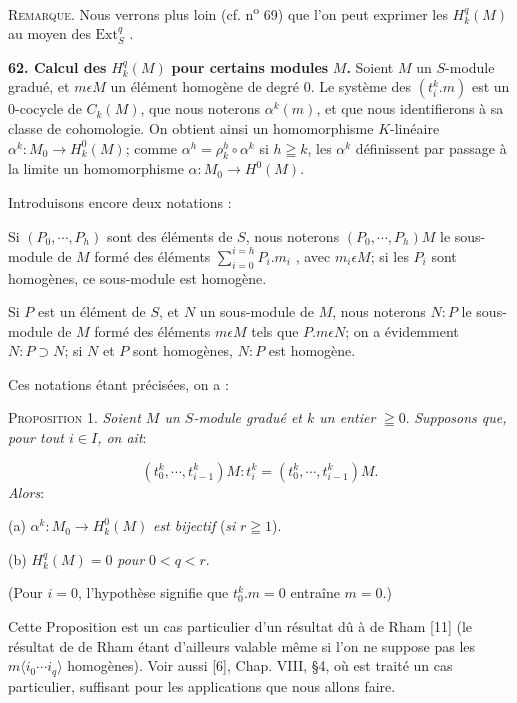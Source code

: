 \textsc{Remarque}. Nous verrons plus loin (cf. n\textsuperscript{o} 69) que l'on peut exprimer les $H^q_k(M)$ au moyen des $\mathrm{Ext}^q_S$ .

\textbf{62. Calcul des} $H^q_k(M)$ \textbf{pour certains modules} $M$\textbf{.} Soient $M$ un $S$-module gradué, et $m \epsilon M$ un élément homogène de degré 0. Le système des $(t^k_i.m)$ est un 0-cocycle de $C_k(M)$, que nous noterons $\alpha^k(m)$, et que nous identifierons à sa classe de cohomologie. On obtient ainsi un homomorphisme $K$-linéaire $\alpha^k: M_0 \to H^0_k(M)$; comme $\alpha^h = \rho^h_k \circ \alpha^k$ si $h \geqq k$, les $\alpha^k$ définissent par passage à la limite un homomorphisme $\alpha: M_0 \to H^0(M)$.

Introduisons encore deux notations :

Si $(P_0 , \cdots , P_h)$ sont des éléments de $S$, nous noterons $(P_0 , \cdots , P_h)M$ le sous-module de $M$ formé des éléments $\sum_{i=0}^{i=h} P_i.m_i$ , avec $m_i \epsilon M$; si les $P_i$ sont homogènes, ce sous-module est homogène.

Si $P$ est un élément de $S$, et $N$ un sous-module de $M$, nous noterons $N:P$ le sous-module de $M$ formé des éléments $m \epsilon M$ tels que $P.m \epsilon N$; on a évidemment $N:P \supset N$; si $N$ et $P$ sont homogènes, $N:P$ est homogène.

Ces notations étant précisées, on a :



\textsc{Proposition 1.} \textit{Soient $M$ un $S$-module gradué et $k$ un entier} $\geqq 0$. \textit{Supposons que, pour tout $i \in I$, on ait}:

\begin{equation*}
(t_0^k , \cdots , t_{i-1}^k)M : t_i^k = (t_0^k , \cdots , t_{i-1}^k)M.
\end{equation*}
\textit{Alors}:

(a) $\alpha^k : M_0 \to H_k^0(M)$ \textit{est bijectif} (\textit{si} $r \geqq 1$).

(b) $H_k^q(M) = 0$ \textit{pour} $0 < q < r$.

(Pour $i = 0$, l'hypothèse signifie que $t_0^k.m = 0$ entraîne $m = 0$.)

Cette Proposition est un cas particulier d'un résultat dû à de Rham [11] (le résultat de de Rham étant d'ailleurs valable même si l'on ne suppose pas les $m\langle i_0 \cdots i_q \rangle$ homogènes). Voir aussi [6], Chap. VIII, §4, où est traité un cas particulier, suffisant pour les applications que nous allons faire.

